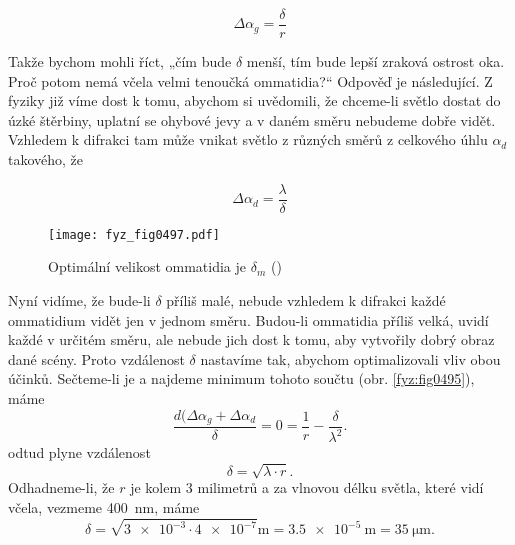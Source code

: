     \begin{equation}\label{fyz:eq682}
      \Delta\alpha_g = \frac{\delta}{r}
    \end{equation}

    Takže bychom mohli říct, „čím bude \(\delta\) menší, tím bude lepší zraková ostrost oka. Proč
    potom nemá včela velmi tenoučká ommatidia?“ Odpověď je následující. Z fyziky již víme dost k
    tomu, abychom si uvědomili, že chceme-li světlo dostat do úzké štěrbiny, uplatní se ohybové jevy
    a v daném směru nebudeme dobře vidět. Vzhledem k difrakci tam může vnikat světlo z různých směrů
    z celkového úhlu \(\alpha_d\) takového, že
    
    \begin{equation}\label{fyz:eq587}
      \Delta\alpha_d = \frac{\lambda}{\delta}
    \end{equation}    

    \begin{figure}[ht!] %
      \centering
      \texttt{[image: fyz\_fig0497.pdf]}
      \caption{Optimální velikost ommatidia je \(\delta_m\) (\cite[s.~697]{Feynman01})}
      \label{fyz:fig0497}
    \end{figure}

    Nyní vidíme, že bude-li \(\delta\) příliš malé, nebude vzhledem k difrakci každé ommatidium
    vidět jen v jednom směru. Budou-li ommatidia příliš velká, uvidí každé v určitém směru, ale
    nebude jich dost k tomu, aby vytvořily dobrý obraz dané scény. Proto vzdálenost \(\delta\)
    nastavíme tak, abychom optimalizovali vliv obou účinků. Sečteme-li je a najdeme minimum tohoto
    součtu (obr. \ref{fyz:fig0495}), máme
    \begin{equation}\label{fyz:eq588}
      \frac{d(\Delta\alpha_g + \Delta\alpha_d}{\delta} = 0 = \frac{1}{r} - \frac{\delta}{\lambda^2}.
    \end{equation}     
    odtud plyne vzdálenost
    \begin{equation}\label{fyz:eq589}
      \delta = \sqrt{\lambda\cdot r}.
    \end{equation} 
    Odhadneme-li, že \(r\) je kolem 3 milimetrů a za vlnovou délku světla, které vidí včela, vezmeme
    \qty{400}{\nm}, máme
    \begin{equation}\label{fyz:eq590}
      \delta = \sqrt{\num{3e-3}\cdot\num{4e-7}}\unit{\m} = \qty{3.5e-5}{\m} = \qty{35}{\micro\m}.
    \end{equation} 

